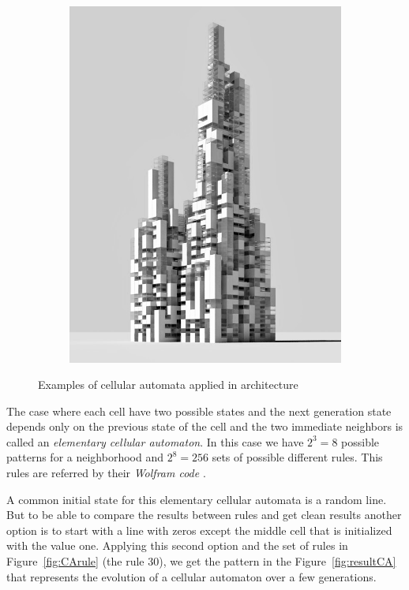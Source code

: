 \begin{figure}
\begin{subfigure}[b]{0.5\textwidth}
                \includegraphics[width=\textwidth]{img/Theory/Cellular_A/main1.jpg}
                \caption{}
        \end{subfigure}
        \caption{Examples of cellular automata applied in architecture}
        \label{fig:CAarchitecture}
\end{figure}

The case where each cell have two possible states and the next generation state depends only on the previous state of the cell and the two immediate neighbors is called an \emph{elementary cellular automaton}. In this case we have $2^3 = 8$ possible patterns for a neighborhood and $2^8 = 256$ sets of possible different rules. This rules are referred by their \emph{Wolfram code} \cite{CellularAutWOLFRAM}. 

A common initial state for this elementary cellular automata is a random line. But to be able to compare the results between rules and get clean results another option is to start with a line with zeros except the middle cell that is initialized with the value one. Applying this second option and the set of rules in Figure~\ref{fig:CArule} (the rule 30), we get the pattern in the Figure~\ref{fig:resultCA} that represents the evolution of a cellular automaton over a few generations.

